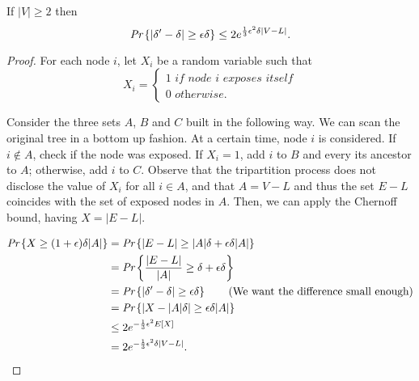 \begin{lem}
	If $|V| \geq 2$ then
	\begin{equation}
	\emph{Pr}\left\{|\delta' - \delta| \geq \epsilon\delta\right\} \leq 2e^{\frac{1}{3}\epsilon^2\delta|V-L|}.
	\end{equation}
\end{lem}
\begin{proof}
	For each node $i$, let $X_i$ be a random variable such that
	\begin{equation}
		X_i = \begin{cases}
		1 \textit{ if node i exposes itself}\\
		0 \textit{ otherwise}.
		\end{cases}
	\end{equation}
	
	Consider the three sets $A$, $B$ and $C$ built in the following way. We can scan the original tree in a bottom up fashion. At a certain time, node $i$ is considered. If $i \not\in A$, check if the node was exposed. If $X_i = 1$, add $i$ to $B$ and every its ancestor to $A$; otherwise, add $i$ to $C$. 
	Observe that the tripartition process does not disclose the value of $X_i$ for all $i \in A$, and that $A = V - L$ and thus the set $E - L$ coincides with the set of exposed nodes in $A$. Then, we can apply the Chernoff bound, having $X = |E - L|$.
	
	\begin{align}
		\emph{Pr}\left\{X \geq (1 + \epsilon)\delta |A|\right\} &= \emph{Pr}\left\{|E - L| \geq |A|\delta + \epsilon\delta|A|\right\}\\
		&=\emph{Pr}\left\{\frac{|E - L|}{|A|} \geq \delta + \epsilon\delta\right\}\\
		&=\emph{Pr}\left\{|\delta'-\delta| \geq \epsilon\delta\right\} \tag{We want the difference small enough}\\
		&= \emph{Pr}\left\{|X - |A|\delta| \geq \epsilon\delta|A|\right\}\\
		&\leq 2e^{-\frac{1}{3}\epsilon^2E\left[X\right]}\\
		& = 2e^{-\frac{1}{3}\epsilon^2\delta|V-L|}.
		\end{align}	
\end{proof}

